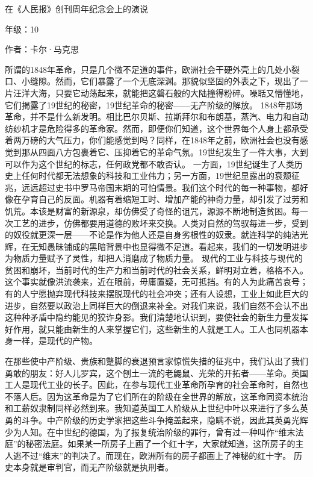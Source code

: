 在《人民报》创刊周年纪念会上的演说

年级：10

作者：卡尔·马克思

所谓的1848年革命，只是几个微不足道的事件，欧洲社会干硬外壳上的几处小裂口、小缝隙。然而，它们暴露了一个无底深渊。那貌似坚固的外表之下，现出了一片汪洋大海，只要它动荡起来，就能把这磐石般的大陆撞得粉碎。噪聒又懵懂地，它们揭露了19世纪的秘密，19世纪革命的秘密——无产阶级的解放。
1848年那场革命，并不是什么新发明。相比巴尔贝斯、拉斯拜尔和布朗基，蒸汽、电力和自动纺纱机才是危险得多的革命家。然而，即便你们知道，这个世界每个人身上都承受着两万磅的大气压力，你们能感觉到吗？同样，在1848年之前，欧洲社会也没有感觉到那从四面八方包裹着它、压抑着它的革命气氛。19世纪发生了一件大事，大到可以作为这个世纪的标志，任何政党都不敢否认。
一方面，19世纪诞生了人类历史上任何时代都无法想象的科技和工业伟力；另一方面，19世纪显露出的衰颓征兆，远远超过史书中罗马帝国末期的可怕情景。我们这个时代的每一种事物，都好像在孕育自己的反面。机器有着缩短工时、增加产能的神奇力量，却引发了过劳和饥荒。本该是财富的新源泉，却仿佛受了奇怪的诅咒，源源不断地制造贫困。每一次工艺的进步，仿佛都要用道德的败坏来交换。人类对自然的驾驭每进一步，受到的奴役就更深一层——不论是作为他人还是自身劣根性的奴隶。就连科学的纯洁光辉，在无知愚昧铺成的黑暗背景中也显得微不足道。看起来，我们的一切发明进步为物质力量赋予了灵性，却把人消磨成了物质力量。
现代的工业与科技与现代的贫困和崩坏，当前时代的生产力和当前时代的社会关系，鲜明对立着，格格不入。这个事实就像洪流袭来，近在眼前，毋庸置疑，无可抵挡。有的人为此痛苦哀号；有的人宁愿抛弃现代科技来摆脱现代的社会冲突；还有人设想，工业上如此巨大的进步，自然要以政治上同样巨大的倒退来补全。对我们来说，我们自然不会认不出这种种矛盾中隐约能见的狡诈身影。我们清楚地认识到，要使社会的新生力量发挥好作用，就只能由新生的人来掌握它们，这些新生的人就是工人。工人也同机器本身一样，是现代的产物。

在那些使中产阶级、贵族和蹩脚的衰退预言家惊慌失措的征兆中，我们认出了我们勇敢的朋友：好人儿罗宾，这个刨土一流的老鼹鼠、光荣的开拓者——革命。英国工人是现代工业的长子。因此，在参与现代工业革命所孕育的社会革命时，自然也不落人后。因为这革命是为了它们所在的阶级在全世界的解放，这革命同资本统治和工薪奴隶制同样必然到来。我知道英国工人阶级从上世纪中叶以来进行了多么英勇的斗争。中产阶级的历史学家把这些斗争掩盖起来，隐瞒不说，因此其英勇光辉少为人知。在中世纪的德国，为了报复统治阶级的罪行，曾有过一种叫作“维末法庭”的秘密法庭。如果某一所房子上画了一个红十字，大家就知道，这所房子的主人逃不过“维末”的判决了。而现在，欧洲所有的房子都画上了神秘的红十字。
历史本身就是审判官，而无产阶级就是执刑者。